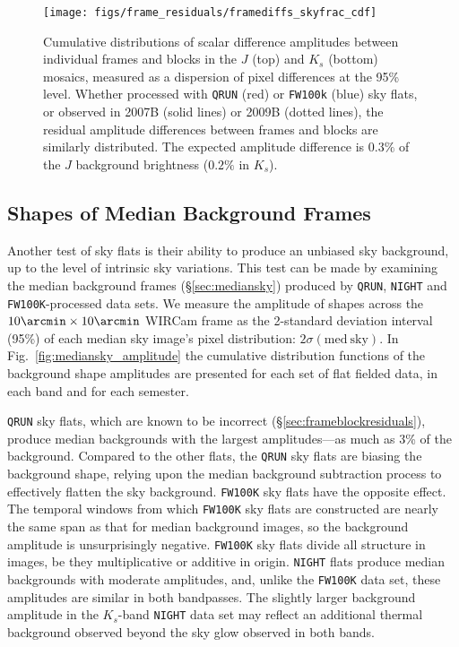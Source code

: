 \documentclass[iop]{emulateapj}
\newcommand{\mycomment}[1]{\textcolor{OliveGreen}{\textit{#1}}} %
\newcommand{\Fig}[1]{Fig.~\ref{fig:#1}}  %
\newcommand{\Sec}[1]{\S\ref{sec:#1}}  %
\begin{document}
\begin{figure}[t]
\centering
\texttt{[image: figs/frame\_residuals/framediffs\_skyfrac\_cdf]}
\caption{Cumulative distributions of scalar difference amplitudes between individual frames and blocks in the $J$ (top) and $K_s$ (bottom) mosaics, measured as a dispersion of pixel differences at the 95\% level.
Whether processed with \texttt{QRUN} (red) or \texttt{FW100k} (blue) sky flats, or observed in 2007B (solid lines) or 2009B (dotted lines), the residual amplitude differences between frames and blocks are similarly distributed.
The expected amplitude difference is $0.3\%$ of the $J$ background brightness ($0.2\%$ in $K_s$).
}
\label{fig:frame_diffs_skyfrac}
\end{figure}


\subsection{Shapes of Median Background Frames}
\label{sec:medianskyshapes}

Another test of sky flats is their ability to produce an unbiased sky background, up to the level of intrinsic sky variations.
This test can be made by examining the median background frames (\Sec{mediansky}) produced by \texttt{QRUN}, \texttt{NIGHT} and \texttt{FW100K}-processed data sets.
We measure the amplitude of shapes across the $10\arcmin \times 10\arcmin$ WIRCam frame as the 2-standard deviation interval (95\%) of each median sky image's pixel distribution: $2 \sigma(\mathrm{med~sky})$.
In \Fig{mediansky_amplitude} the cumulative distribution functions of the background shape amplitudes are presented for each set of flat fielded data, in each band and for each semester.

\texttt{QRUN} sky flats, which are known to be incorrect (\Sec{frameblockresiduals}), produce median backgrounds with the largest amplitudes---as much as 3\% of the background.
Compared to the other flats, the \texttt{QRUN} sky flats are biasing the background shape, relying upon the median background subtraction process to effectively flatten the sky background.
\texttt{FW100K} sky flats have the opposite effect.
The temporal windows from which \texttt{FW100K} sky flats are constructed are nearly the same span as that for median background images, so the background amplitude is unsurprisingly negative.
\texttt{FW100K} sky flats divide all structure in images, be they multiplicative or additive in origin.
\texttt{NIGHT} flats produce median backgrounds with moderate amplitudes, and, unlike the \texttt{FW100K} data set, these amplitudes are similar in both bandpasses.
The slightly larger background amplitude in the $K_s$-band \texttt{NIGHT} data set may reflect an additional thermal background observed beyond the sky glow observed in both bands.
\end{document}

